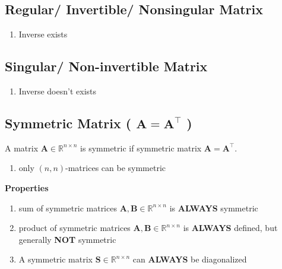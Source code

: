 
\subsection{Regular/ Invertible/ Nonsingular Matrix \cite{mfml-1}} \label{Regular/ Invertible/ Nonsingular Matrix}

\begin{enumerate}
    \item Inverse exists
\end{enumerate}


\subsection{Singular/ Non-invertible Matrix \cite{mfml-1}}\label{Singular/ Non-invertible Matrix}

\begin{enumerate}
    \item Inverse doesn’t exists
\end{enumerate}


\subsection{Symmetric Matrix ( $\mathbf{A = A^\top}$ ) \cite{mfml-1}}\label{Symmetric Matrix}
A matrix $\mathbf{A} \in \mathbb{R}^{n\times n}$ is symmetric if symmetric matrix $\mathbf{A = A^\top}$.

\begin{enumerate}
    \item only $(n, n)$-matrices can be symmetric
\end{enumerate}

\textbf{Properties}
\begin{enumerate}
    \item sum of symmetric matrices $\mathbf{A, B} \in \mathbb{R}^{n\times n}$ is \textbf{ALWAYS} symmetric

    \item product of symmetric matrices $\mathbf{A, B} \in \mathbb{R}^{n\times n}$ is \textbf{ALWAYS} defined, but generally \textbf{NOT} symmetric

    \item A symmetric matrix $\mathbf{S} \in \mathbb{R}^{n\times n}$ can \textbf{ALWAYS} be diagonalized
\end{enumerate}

